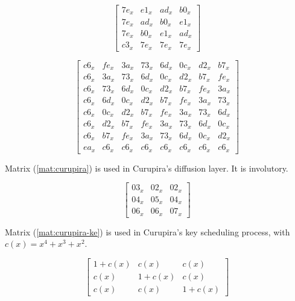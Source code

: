 \begin{equation}\label{mat:fox-mu4-inv}
\begin{bmatrix}
7e_x & e1_x & ad_x & b0_x\\
7e_x & ad_x & b0_x & e1_x\\
7e_x & b0_x & e1_x & ad_x\\
c3_x & 7e_x & 7e_x & 7e_x
\end{bmatrix}
\end{equation}

\begin{equation}\label{mat:fox-mu8-inv}
\begin{bmatrix}
c6_x & fe_x & 3a_x & 73_x & 6d_x & 0c_x & d2_x & b7_x\\
c6_x & 3a_x & 73_x & 6d_x & 0c_x & d2_x & b7_x & fe_x\\
c6_x & 73_x & 6d_x & 0c_x & d2_x & b7_x & fe_x & 3a_x\\
c6_x & 6d_x & 0c_x & d2_x & b7_x & fe_x & 3a_x & 73_x\\
c6_x & 0c_x & d2_x & b7_x & fe_x & 3a_x & 73_x & 6d_x\\
c6_x & d2_x & b7_x & fe_x & 3a_x & 73_x & 6d_x & 0c_x\\
c6_x & b7_x & fe_x & 3a_x & 73_x & 6d_x & 0c_x & d2_x\\
ea_x & c6_x & c6_x & c6_x & c6_x & c6_x & c6_x & c6_x
\end{bmatrix}
\end{equation}

Matrix (\ref{mat:curupira}) is used in Curupira's diffusion layer. It is involutory.

\begin{equation}\label{mat:curupira}
\begin{bmatrix}
03_x & 02_x & 02_x\\
04_x & 05_x & 04_x\\
06_x & 06_x & 07_x
\end{bmatrix}
\end{equation}

Matrix (\ref{mat:curupira-ke}) is used in Curupira's key scheduling process, with $c(x) = x^4 + x^3 + x^2$.

\begin{equation}\label{mat:curupira-ke}
\begin{bmatrix}
1+c(x) & c(x) & c(x)\\
c(x) & 1+c(x) & c(x)\\
c(x) & c(x) & 1+c(x)
\end{bmatrix}
\end{equation}

